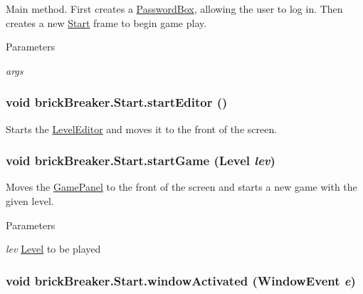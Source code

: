Main method. First creates a \hyperlink{classbrick_breaker_1_1_password_box}{PasswordBox}, allowing the user to log in. Then creates a new \hyperlink{classbrick_breaker_1_1_start}{Start} frame to begin game play. 
\begin{DoxyParams}{Parameters}
\item[{\em args}]\end{DoxyParams}
\hypertarget{classbrick_breaker_1_1_start_a398e72365f82fe4214ea3534bfa34270}{
\subsubsection[{startEditor}]{\setlength{\rightskip}{0pt plus 5cm}void brickBreaker.Start.startEditor ()}}
\label{classbrick_breaker_1_1_start_a398e72365f82fe4214ea3534bfa34270}
Starts the \hyperlink{classbrick_breaker_1_1_level_editor}{LevelEditor} and moves it to the front of the screen. \hypertarget{classbrick_breaker_1_1_start_afe4437abe9e58312599f173ef8cc3033}{
\subsubsection[{startGame}]{\setlength{\rightskip}{0pt plus 5cm}void brickBreaker.Start.startGame ({\bf Level} {\em lev})}}
\label{classbrick_breaker_1_1_start_afe4437abe9e58312599f173ef8cc3033}
Moves the \hyperlink{classbrick_breaker_1_1_game_panel}{GamePanel} to the front of the screen and starts a new game with the given level. 
\begin{DoxyParams}{Parameters}
\item[{\em lev}]\hyperlink{classbrick_breaker_1_1_level}{Level} to be played \end{DoxyParams}
\hypertarget{classbrick_breaker_1_1_start_a8a00f5a3b3b443b9d54ea98808ffab37}{
\subsubsection[{windowActivated}]{\setlength{\rightskip}{0pt plus 5cm}void brickBreaker.Start.windowActivated (WindowEvent {\em e})}}
\label{classbrick_breaker_1_1_start_a8a00f5a3b3b443b9d54ea98808ffab37}
